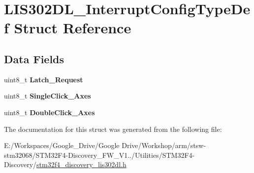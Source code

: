 \hypertarget{struct_l_i_s302_d_l___interrupt_config_type_def}{\section{L\-I\-S302\-D\-L\-\_\-\-Interrupt\-Config\-Type\-Def Struct Reference}
\label{struct_l_i_s302_d_l___interrupt_config_type_def}
}
\subsection*{Data Fields}
\begin{DoxyCompactItemize}
\item 
\hypertarget{struct_l_i_s302_d_l___interrupt_config_type_def_a3a4b0aa8f181d3a7f4d012f374e9ec87}{uint8\-\_\-t {\bfseries Latch\-\_\-\-Request}}\label{struct_l_i_s302_d_l___interrupt_config_type_def_a3a4b0aa8f181d3a7f4d012f374e9ec87}

\item 
\hypertarget{struct_l_i_s302_d_l___interrupt_config_type_def_a7ae88679a9b5792f3c1a9cdf6dfa6ab9}{uint8\-\_\-t {\bfseries Single\-Click\-\_\-\-Axes}}\label{struct_l_i_s302_d_l___interrupt_config_type_def_a7ae88679a9b5792f3c1a9cdf6dfa6ab9}

\item 
\hypertarget{struct_l_i_s302_d_l___interrupt_config_type_def_a5fc8c79cd7bcb7f4fd2686471e0770df}{uint8\-\_\-t {\bfseries Double\-Click\-\_\-\-Axes}}\label{struct_l_i_s302_d_l___interrupt_config_type_def_a5fc8c79cd7bcb7f4fd2686471e0770df}

\end{DoxyCompactItemize}


The documentation for this struct was generated from the following file\-:\begin{DoxyCompactItemize}
\item 
E\-:/\-Workspaces/\-Google\-\_\-\-Drive/\-Google Drive/\-Workshop/arm/stsw-\/stm32068/\-S\-T\-M32\-F4-\/\-Discovery\-\_\-\-F\-W\-\_\-\-V1../\-Utilities/\-S\-T\-M32\-F4-\/\-Discovery/\hyperlink{stm32f4__discovery__lis302dl_8h}{stm32f4\-\_\-discovery\-\_\-lis302dl.\-h}\end{DoxyCompactItemize}
